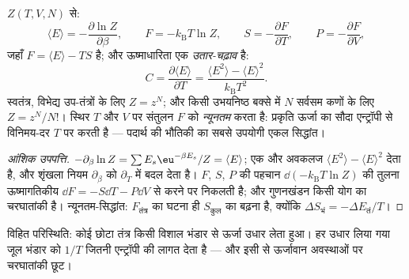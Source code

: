 \begin{proposition}[मशीन]\label{prop:b3:canonical-ensemble:machine}
$Z(T, V, N)$ से:
\[
\langle E\rangle = -\frac{\partial\ln Z}{\partial\beta} , \qquad
F = -k_{\text{B}}T\ln Z , \qquad
S = -\frac{\partial F}{\partial T} , \qquad
P = -\frac{\partial F}{\partial V} ,
\]
जहाँ $F = \langle E\rangle - TS$ \emph{} है; और
ऊष्माधारिता एक \emph{उतार-चढ़ाव} है:
\[
C = \frac{\partial\langle E\rangle}{\partial T}
 = \frac{\langle E^2\rangle - \langle E\rangle^2}
{k_{\text{B}}T^2} .
\]
स्वतंत्र, विभेद्य उप-तंत्रों के लिए $Z = z^N$; और किसी उभयनिष्ठ बक्से
में $N$ सर्वसम कणों के लिए $Z = z^N/N!$। स्थिर $T$ और
$V$ पर संतुलन $F$ को \emph{न्यूनतम} करता है: प्रकृति ऊर्जा का सौदा
एन्ट्रॉपी से विनिमय-दर $T$ पर करती है --- पदार्थ की भौतिकी का सबसे
उपयोगी एकल सिद्धांत।
\end{proposition}

\begin{proof}[आंशिक उपपत्ति]
$-\partial_\beta\ln Z = \sum E_s\eu^{-\beta E_s}/Z = \langle
E\rangle$; एक और अवकलज $\langle E^2\rangle - \langle
E\rangle^2$ देता है, और शृंखला नियम $\partial_\beta$ को
$\partial_T$ में बदल देता है। $F$, $S$, $P$ की पहचान
$\dd(-k_{\text{B}}T\ln Z)$ की तुलना ऊष्मागतिकीय
$\dd F = -S\dd T - P\dd V$ से करने पर निकलती है; और गुणनखंडन किसी
योग का चरघातांकी है। न्यूनतम-सिद्धांत: $F_{\text{तंत्र}}$ का घटना ही
$S_{\text{कुल}}$ का बढ़ना है, क्योंकि $\Delta S_{\text{भं}} =
-\Delta E_{\text{तं}}/T$।
\end{proof}

\begin{omfigure}

{\small विहित परिस्थिति: कोई छोटा तंत्र किसी विशाल भंडार से ऊर्जा
उधार लेता हुआ। हर उधार लिया गया जूल भंडार को $1/T$ जितनी एन्ट्रॉपी
की लागत देता है --- और इसी से ऊर्जावान अवस्थाओं पर चरघातांकी छूट।}
\end{omfigure}

